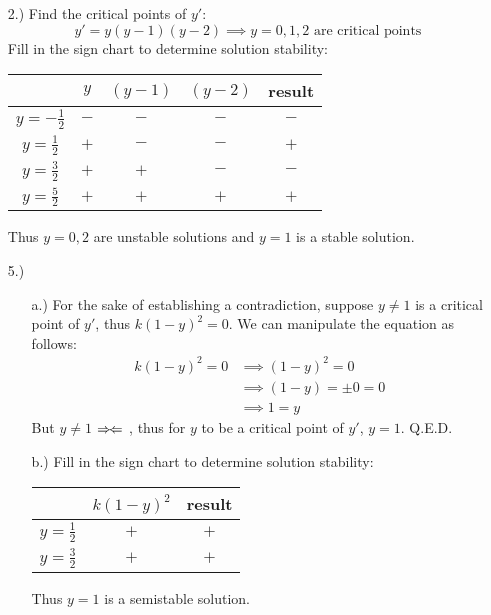 \documentclass[12pt]{article}
\newcommand{\contradiction}{
    \ensuremath{{\Rightarrow\mspace{-2mu}\Leftarrow}}
}
\begin{document}
\pagestyle{fancy}
\fancyhead{}

\normalsize
\begin{itemize}
    \item [2.)] Find the critical points of $y'$:
    \[y'=y(y-1)(y-2)\implies y=0,1,2\text{ are critical points}\]
    Fill in the sign chart to determine solution stability:
    \begin{center}
        \begin{tabular}{c|c|c|c|c}
            & $y$ & $(y-1)$ & $(y-2)$ & result\\
            \hline
            $y=-\frac{1}{2}$ & $-$ & $-$ & $-$ & $-$\\
            $y=\frac{1}{2}$ & $+$ & $-$ & $-$ & $+$\\
            $y=\frac{3}{2}$ & $+$ & $+$ & $-$ & $-$\\
            $y=\frac{5}{2}$ & $+$ & $+$ & $+$ & $+$\\
        \end{tabular}
    \end{center}
    Thus $y=0,2$ are unstable solutions and $y=1$ is a stable solution.

    \item [5.)] \begin{itemize}
        \item [a.)] For the sake of establishing a contradiction, suppose $y\neq1$ is a critical point of $y'$, thus $k(1-y)^2=0$. We can manipulate the equation as follows:
        \begin{align*}
            k(1-y)^2=0&\implies(1-y)^2=0\\
            &\implies(1-y)=\pm0=0\\
            &\implies1=y
        \end{align*}
        But $y\neq1$\contradiction, thus for $y$ to be a critical point of $y'$, $y=1$. Q.E.D.

        \item [b.)] Fill in the sign chart to determine solution stability:
        \begin{center}
            \begin{tabular}{c|c|c}
                & $k(1-y)^2$ & result\\
                \hline
                $y=\frac{1}{2}$ & $+$ & $+$\\
                $y=\frac{3}{2}$ & $+$ & $+$\\
            \end{tabular}
        \end{center}
        Thus $y=1$ is a semistable solution.


\end{itemize}
\end{itemize}
\end{document}
